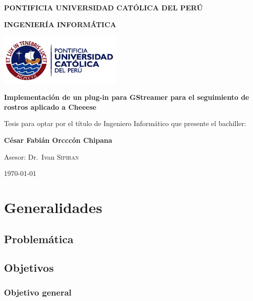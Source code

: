 \documentclass[a4paper,openright,12pt]{report}
\begin{document}
\begin{titlepage}
	\centering

	{\sffamily\large\bfseries PONTIFICIA UNIVERSIDAD CATÓLICA DEL PERÚ \par}
	\vspace{0.2cm}
	{\sffamily\large\bfseries INGENIERÍA INFORMÁTICA\par}
	\vfill

	\includegraphics[width=6cm]{../images/logo-pucp.png}\par\vspace{1cm}
	\vspace{1.5cm}

	{\sffamily\large\bfseries Implementación de un plug-in para GStreamer para
	el seguimiento de rostros aplicado a Cheeese\par}
	\vspace{2cm}

	{\sffamily\small Tesis para optar por el título de Ingeniero Informático que presente el
	bachiller: }

	{\sffamily\Large\bf	César Fabián Orcccón Chipana \par}
	{ \par}
	\vfill
	{\sffamily Asesor: Dr.~Ivan \textsc{Sipiran} \par}

	\vfill

	{\sffamily\large \today\par}
\end{titlepage}



\tableofcontents
\chapter{Generalidades}
\section{Problemática}
\section{Objetivos}
\subsection{Objetivo general}
\end{document}
